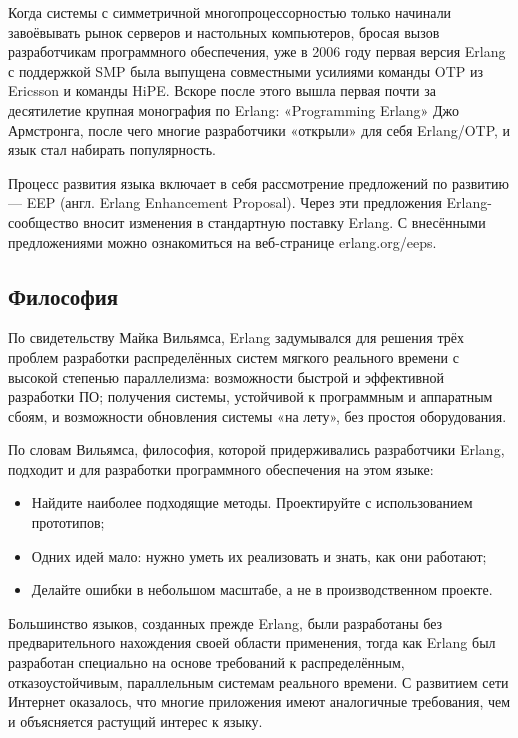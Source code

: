 \documentclass[12pt]{article}
\begin{document}
Когда системы с симметричной многопроцессорностью только начинали завоёвывать рынок серверов и настольных компьютеров, бросая вызов разработчикам программного обеспечения, уже в 2006 году первая версия Erlang с поддержкой SMP была выпущена совместными усилиями команды OTP из Ericsson и команды HiPE. Вскоре после этого вышла первая почти за десятилетие крупная монография по Erlang: «Programming Erlang» Джо Армстронга, после чего многие разработчики «открыли» для себя Erlang/OTP, и язык стал набирать популярность.

Процесс развития языка включает в себя рассмотрение предложений по развитию — EEP (англ. Erlang Enhancement Proposal). Через эти предложения Erlang-сообщество вносит изменения в стандартную поставку Erlang. С внесёнными предложениями можно ознакомиться на веб-странице erlang.org/eeps.
\subsection*{Философия}
По свидетельству Майка Вильямса, Erlang задумывался для решения трёх проблем разработки распределённых систем мягкого реального времени с высокой степенью параллелизма: возможности быстрой и эффективной разработки ПО; получения системы, устойчивой к программным и аппаратным сбоям, и возможности обновления системы «на лету», без простоя оборудования.

По словам Вильямса, философия, которой придерживались разработчики Erlang, подходит и для разработки программного обеспечения на этом языке:

\begin{displayquote}
\begin{itemize}
\item Найдите наиболее подходящие методы. Проектируйте с использованием прототипов;
\item Одних идей мало: нужно уметь их реализовать и знать, как они работают;
\item Делайте ошибки в небольшом масштабе, а не в производственном проекте.
\end{itemize}
\end{displayquote}

Большинство языков, созданных прежде Erlang, были разработаны без предварительного нахождения своей области применения, тогда как Erlang был разработан специально на основе требований к распределённым, отказоустойчивым, параллельным системам реального времени. С развитием сети Интернет оказалось, что многие приложения имеют аналогичные требования, чем и объясняется растущий интерес к языку.
\end{document}
